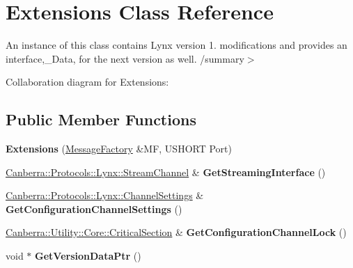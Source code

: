 \hypertarget{class_extensions}{}\section{Extensions Class Reference}
\label{class_extensions}


An instance of this class contains Lynx version 1. modifications and provides an interface,\+\_\+\+Data, for the next version as well. /summary$>$  




Collaboration diagram for Extensions\+:
\subsection*{Public Member Functions}
\begin{DoxyCompactItemize}
\item 
\mbox{\label{class_extensions_ae49e8ee9a65b5c26b6f9665a48ff0273}} 
{\bfseries Extensions} (\hyperlink{class_canberra_1_1_data_types_1_1_serialization_1_1_message_factory}{Message\+Factory} \&MF, U\+S\+H\+O\+RT Port)
\item 
\mbox{\label{class_extensions_a81e94f3ea829a0e7091c56d262a95f2c}} 
\hyperlink{class_canberra_1_1_protocols_1_1_lynx_1_1_stream_channel}{Canberra\+::\+Protocols\+::\+Lynx\+::\+Stream\+Channel} \& {\bfseries Get\+Streaming\+Interface} ()
\item 
\mbox{\label{class_extensions_acc3183084e437cd9f1548b8bba18ad7d}} 
\hyperlink{class_canberra_1_1_protocols_1_1_lynx_1_1_channel_settings}{Canberra\+::\+Protocols\+::\+Lynx\+::\+Channel\+Settings} \& {\bfseries Get\+Configuration\+Channel\+Settings} ()
\item 
\mbox{\label{class_extensions_aba8243e605a2db414dc234d060182118}} 
\hyperlink{class_canberra_1_1_utility_1_1_core_1_1_critical_section}{Canberra\+::\+Utility\+::\+Core\+::\+Critical\+Section} \& {\bfseries Get\+Configuration\+Channel\+Lock} ()
\item 
\mbox{\label{class_extensions_a5a862285a707977c9e67a15c1b31692c}} 
void $\ast$ {\bfseries Get\+Version\+Data\+Ptr} ()
\end{DoxyCompactItemize}
